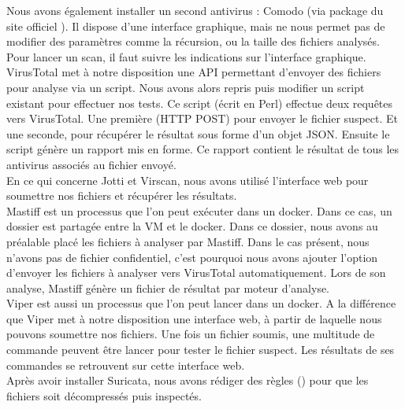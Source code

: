 \documentclass[smallextended]{svjour3}       %
\begin{document}
$ $\\
Nous avons également installer un second antivirus : Comodo (via package du site officiel \cite{Comodo}). Il dispose d'une interface graphique, mais ne nous permet pas de modifier des paramètres comme la récursion, ou la taille des fichiers analysés. Pour lancer un scan, il faut suivre les indications sur l'interface graphique.\\
$ $\\
VirusTotal met à notre disposition une API permettant d'envoyer des fichiers pour analyse via un script. Nous avons alors repris puis modifier un script existant pour effectuer nos tests. Ce script (écrit en Perl) effectue deux requêtes vers VirusTotal. Une première (HTTP POST) pour envoyer le fichier suspect. Et une seconde, pour récupérer le résultat sous forme d'un objet JSON. Ensuite le script génère un rapport mis en forme. Ce rapport contient le résultat de tous les antivirus associés au fichier envoyé.\\
$ $\\
En ce qui concerne Jotti et Virscan, nous avons utilisé l'interface web pour soumettre nos fichiers et récupérer les résultats.\\
$ $\\
Mastiff est un processus que l'on peut exécuter dans un docker. Dans ce cas, un dossier est partagée entre la VM et le docker. Dans ce dossier, nous avons au préalable placé les fichiers à analyser par Mastiff. Dans le cas présent, nous n'avons pas de fichier confidentiel, c'est pourquoi nous avons ajouter l'option d'envoyer les fichiers à analyser vers VirusTotal automatiquement. Lors de son analyse, Mastiff génère un fichier de résultat par moteur d'analyse.\\
$ $\\
Viper est aussi un processus que l'on peut lancer dans un docker. A la différence que Viper met à notre disposition une interface web, à partir de laquelle nous pouvons soumettre nos fichiers. Une fois un fichier soumis, une multitude de commande peuvent être lancer pour tester le fichier suspect. Les résultats de ses commandes se retrouvent sur cette interface web.\\
$ $\\
Après avoir installer Suricata, nous avons rédiger des règles (\cite{SuricataExtraction}) pour que les fichiers soit décompressés puis inspectés. 
\end{document}
